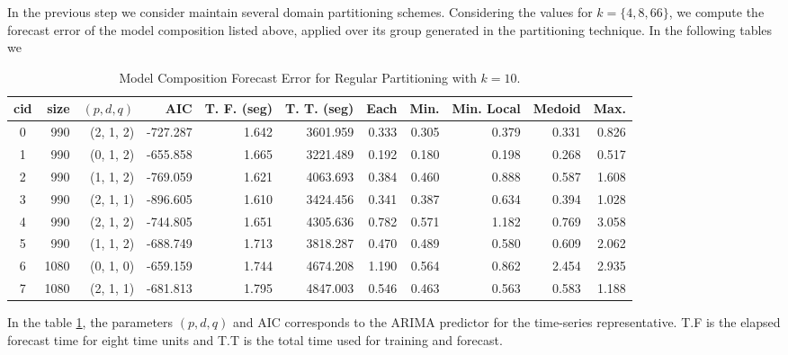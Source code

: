 In the previous step we consider maintain several domain partitioning schemes. Considering the values for $k = \{4, 8, 66\}$, we compute the forecast error of the model composition listed above, applied over its group generated in the partitioning technique. In the following tables we 

\begin{table}[h]
	\centering
	\tiny
	\begin{tabular}{|c|r|r|r|r|r|r|r|r|r|r|}
		\hline
		cid & size & $(p, d, q)$ & AIC & T. F. (seg) & T. T. (seg) & Each & Min. & Min. Local & Medoid & Max. \\
		\hline
		0 &  990 & (2, 1, 2) & -727.287 & 1.642 & 3601.959 & 0.333 & 0.305 & 0.379 & 0.331 & 0.826 \\
		1 &  990 & (0, 1, 2) & -655.858 & 1.665 & 3221.489 & 0.192 & 0.180 & 0.198 & 0.268 & 0.517 \\
		2 &  990 & (1, 1, 2) & -769.059 & 1.621 & 4063.693 & 0.384 & 0.460 & 0.888 & 0.587 & 1.608 \\
		3 &  990 & (2, 1, 1) & -896.605 & 1.610 & 3424.456 & 0.341 & 0.387 & 0.634 & 0.394 & 1.028 \\
		4 &  990 & (2, 1, 2) & -744.805 & 1.651 & 4305.636 & 0.782 & 0.571 & 1.182 & 0.769 & 3.058 \\
		5 &  990 & (1, 1, 2) & -688.749 & 1.713 & 3818.287 & 0.470 & 0.489 & 0.580 & 0.609 & 2.062 \\
		6 & 1080 & (0, 1, 0) & -659.159 & 1.744 & 4674.208 & 1.190 & 0.564 & 0.862 & 2.454 & 2.935 \\
		7 & 1080 & (2, 1, 1) & -681.813 & 1.795 & 4847.003 & 0.546 & 0.463 & 0.563 & 0.583 & 1.188 \\ \hline
	\end{tabular}
	\caption{Model Composition Forecast Error for Regular Partitioning with $k=10$.}
	\label{Table:ForecastErrorRegulark10}
\end{table}

In the table \ref{Table:ForecastErrorRegulark10}, the parameters $(p, d, q)$ and  AIC corresponds to the ARIMA predictor for the time-series representative. T.F is the elapsed forecast time for eight time units and T.T is the total time used for training and forecast. 

